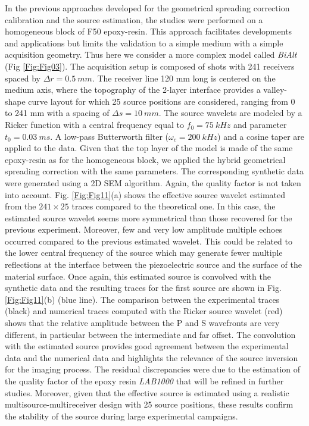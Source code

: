 \documentclass[extra,mreferee]{gji}
\newcommand{\bialt}{\textit{BiAlt} }
\newenvironment{orangenote}{\par\color{Orange}}{\par}
\begin{document}
\begin{orangenote}
In the previous approaches developed for the geometrical spreading correction calibration and the source estimation, the studies were performed on a homogeneous block of F50 epoxy-resin. This approach facilitates developments and applications but limits the validation to a simple medium with a simple acquisition geometry. Thus here we consider a more complex model called \bialt (Fig \ref{Fig:Fig03}). The acquisition setup is composed of shots with 241 receivers spaced by $\Delta r=0.5\ mm$. The receiver line 120 mm long is centered on the medium axis, where the topography of the 2-layer interface provides a valley-shape curve layout for which 25 source positions are considered, ranging from 0 to 241 mm with a spacing of $\Delta s=10\ mm$. The source wavelets are modeled by a Ricker function with a central frequency equal to $f_{0}=75\ kHz$ and parameter $t_{0}=0.03\ ms$. A low-pass Butterworth filter ($\omega_{c}=200\ kHz$) and a cosine taper are applied to the data. Given that the top layer of the model is made of the same epoxy-resin as for the homogeneous block, we applied the hybrid geometrical spreading correction with the same parameters. The corresponding synthetic data were generated using a 2D SEM algorithm. Again, the quality factor is not taken into account. Fig. \ref{Fig:Fig11}(a) shows the effective source wavelet estimated from the $241 \times 25$ traces compared to the theoretical one. In this case, the estimated source wavelet seems more symmetrical than those recovered for the previous experiment. Moreover, few and very low amplitude multiple echoes occurred compared to the previous estimated wavelet. This could be related to the lower central frequency of the source which may generate fewer multiple reflections at the interface between the piezoelectric source and the surface of the material surface. Once again, this estimated source is convolved with the synthetic data and the resulting traces for the first source are shown in Fig. \ref{Fig:Fig11}(b) (blue line). The comparison between the experimental traces (black) and numerical traces computed with the Ricker source wavelet (red) shows that the relative amplitude between the P and S wavefronts are very different, in particular between the intermediate and far offset. The convolution with the estimated source provides good agreement between the experimental data and the numerical data and highlights the relevance of the source inversion for the imaging process. The residual discrepancies were due to the estimation of the quality factor of the epoxy resin \textit{LAB1000} that will be refined in further studies. Moreover, given that the effective source is estimated using a realistic multisource-multireceiver design with 25 source positions, these results confirm the stability of the source during large experimental campaigns. 

\end{orangenote}
\end{document}
